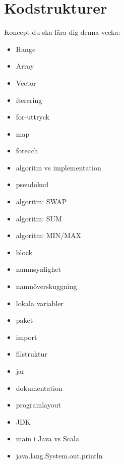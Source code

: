 \chapter{Kodstrukturer}\label{chapter:W02}
Koncept du ska lära dig denna vecka:
\begin{multicols}{2}\begin{itemize}[nosep,label={$\square$},leftmargin=*]
\item Range
\item Array
\item Vector
\item iterering
\item for-uttryck
\item map
\item foreach
\item algoritm vs implementation
\item pseudokod
\item algoritm: SWAP
\item algoritm: SUM
\item algoritm: MIN/MAX
\item block
\item namnsynlighet
\item namnöverskuggning
\item lokala variabler
\item paket
\item import
\item filstruktur
\item jar
\item dokumentation
\item programlayout
\item JDK
\item main i Java vs Scala
\item java.lang.System.out.println\end{itemize}\end{multicols}
